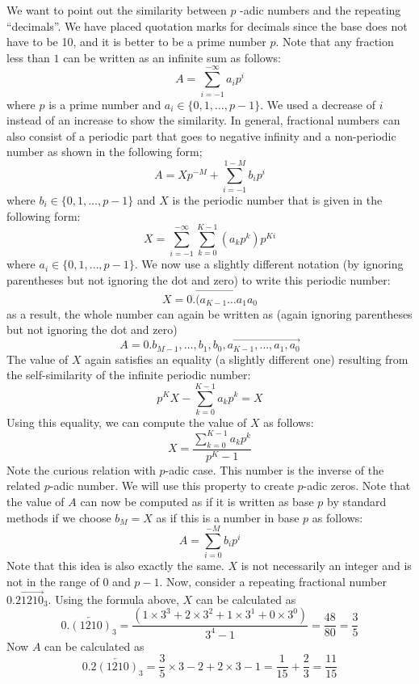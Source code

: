 \documentclass[times,twocolumn,final]{elsarticle}
\begin{document}
We want to point out the similarity between $p$ -adic numbers and the repeating ``decimals''. We have placed quotation marks for decimals since the base does not have to be 10, and it is better to be a prime number $p$. Note that any fraction less than $1$ can be written as an infinite sum as follows: 
\begin{equation}
A = \sum_{i=-1}^{-\infty} a_i p^i
\end{equation} 
where $p$ is a prime number and $a_i \in \{0,1,\ldots,p-1\}$. We used a decrease of $i$ instead of an increase to show the similarity. In general, fractional numbers can also consist of a periodic part that goes to negative infinity and a non-periodic number as shown in the following form; 
\begin{equation}
A = X p^{-M} +  \sum_{i=-1}^{1-M} b_i p^i
\end{equation} 
where $b_i \in \{0,1,\ldots,p-1\}$ and $X$ is the periodic number that is given in the following form: 
\begin{equation}
X = \sum_{i=-1}^{-\infty} \sum_{k=0}^{K-1} (a_k p^k) p^{Ki}
\end{equation} 
where $a_i \in \{0,1,\ldots,p-1\}$.
We now use a slightly different notation (by ignoring parentheses but not ignoring the dot and zero) to write this periodic number:
$$X = 0. \overrightarrow{(a_{K-1}\ldots a_1 a_0}$$
as a result, the whole number can again be written as (again ignoring parentheses but not ignoring the dot and zero)
$$A = 0. b_{M-1},\ldots,b_1,b_0, \overrightarrow{a_{K-1},\ldots,a_1,a_0}$$
The value of $X$ again satisfies an equality (a slightly different one) resulting from the self-similarity of the infinite periodic number: 
\begin{equation}
p^K X -  \sum_{k=0}^{K-1} a_k p^k = X
\end{equation}
Using this equality, we can compute the value of $X$ as follows: 
\begin{equation}
X = \frac{\displaystyle \sum_{k=0}^{K-1} a_k p^k}{p^K-1} 
\end{equation}
Note the curious relation with $p$-adic case. This number is the inverse of the related $p$-adic number. We will use this property to create $p$-adic zeros. Note that the value of $A$ can now be computed as if it is written as base $p$ by standard methods if we choose $b_M = X$ as if this is a number in base $p$ as follows: 
\begin{equation}
A = \sum_{i=0}^{-M} b_i p^i
\end{equation}
Note that this idea is also exactly the same. $X$ is not necessarily an integer and is not in the range of $0$ and $p-1$. Now, consider a repeating fractional number $ 0.2\overrightarrow{1210}_3 $. Using the formula above, $X$ can be calculated as
$$
0.\overleftarrow{(1210)}_3 =\frac{(1\times 3^3 + 2\times 3^2 + 1\times 3^1 + 0 \times 3^0 )}{3^4-1} = \frac{48}{80} = \frac{3}{5}
$$
Now $A$ can be calculated as $$ 0.2 \overleftarrow{(1210)}_3  = \frac{3}{5} \times 3 -2 + 2 \times 3 -1 = \frac{1}{15} + \frac{2}{3} = \frac{11}{15} $$
\end{document}
